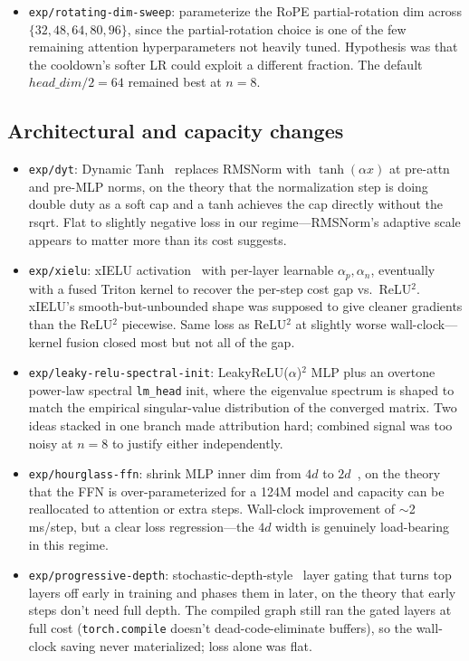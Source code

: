 \documentclass[10pt,letterpaper]{article}
\newcommand{\code}[1]{\texttt{\small #1}}
\begin{document}
\begin{itemize}[leftmargin=1.2em,itemsep=4pt]
  \item \code{exp/rotating-dim-sweep}: parameterize the RoPE partial-rotation dim across $\{32, 48, 64, 80, 96\}$, since the partial-rotation choice is one of the few remaining attention hyperparameters not heavily tuned. Hypothesis was that the cooldown's softer LR could exploit a different fraction. The default $head\_dim/2 = 64$ remained best at $n=8$.
\end{itemize}

\subsection{Architectural and capacity changes}
\begin{itemize}[leftmargin=1.2em,itemsep=4pt]
  \item \code{exp/dyt}: Dynamic Tanh~\cite{dyt} replaces RMSNorm with $\tanh(\alpha x)$ at pre-attn and pre-MLP norms, on the theory that the normalization step is doing double duty as a soft cap and a tanh achieves the cap directly without the rsqrt. Flat to slightly negative loss in our regime---RMSNorm's adaptive scale appears to matter more than its cost suggests.
  \item \code{exp/xielu}: xIELU activation~\cite{xielu} with per-layer learnable $\alpha_p,\alpha_n$, eventually with a fused Triton kernel to recover the per-step cost gap vs.\ ReLU$^2$. xIELU's smooth-but-unbounded shape was supposed to give cleaner gradients than the ReLU$^2$ piecewise. Same loss as ReLU$^2$ at slightly worse wall-clock---kernel fusion closed most but not all of the gap.
  \item \code{exp/leaky-relu-spectral-init}: LeakyReLU($\alpha$)$^2$ MLP plus an overtone power-law spectral \code{lm\_head} init, where the eigenvalue spectrum is shaped to match the empirical singular-value distribution of the converged matrix. Two ideas stacked in one branch made attribution hard; combined signal was too noisy at $n=8$ to justify either independently.
  \item \code{exp/hourglass-ffn}: shrink MLP inner dim from $4d$ to $2d$~\cite{hourglass}, on the theory that the FFN is over-parameterized for a 124M model and capacity can be reallocated to attention or extra steps. Wall-clock improvement of $\sim$2\,ms/step, but a clear loss regression---the $4d$ width is genuinely load-bearing in this regime.
  \item \code{exp/progressive-depth}: stochastic-depth-style~\cite{stochastic_depth} layer gating that turns top layers off early in training and phases them in later, on the theory that early steps don't need full depth. The compiled graph still ran the gated layers at full cost (\code{torch.compile} doesn't dead-code-eliminate buffers), so the wall-clock saving never materialized; loss alone was flat.

\end{itemize}
\end{document}
